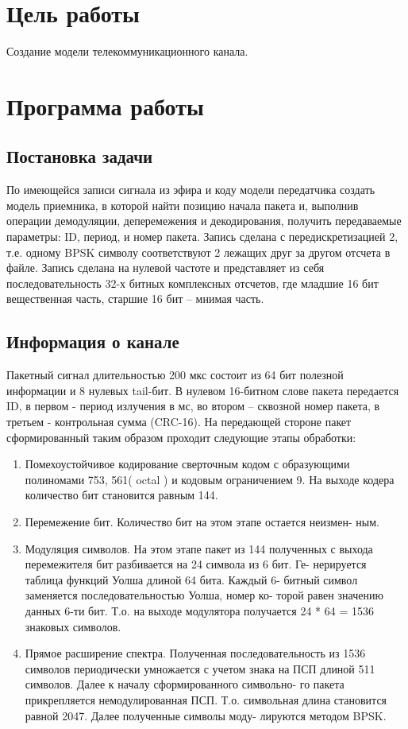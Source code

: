 
\usepackage{minted}




\setcounter{page}{2}



\section{Цель работы}
Создание модели телекоммуникационного канала.

\section{Программа работы}
\subsection{Постановка задачи}
По имеющейся записи сигнала из эфира и коду модели передатчика создать модель приемника, в которой найти позицию начала пакета и, выполнив операции демодуляции, деперемежения и декодирования, получить передаваемые параметры: ID, период, и номер пакета.
Запись сделана с передискретизацией 2, т.е. одному BPSK символу соответствуют 2 лежащих друг за другом отсчета в файле. Запись сделана на нулевой частоте и представляет из себя последовательность 32-х битных комплексных отсчетов, где младшие 16 бит вещественная часть, старшие 16 бит – мнимая часть.

\subsection{Информация о канале}
Пакетный сигнал длительностью 200 мкс состоит из 64 бит полезной информации и 8 нулевых tail-бит. В нулевом 16-битном слове пакета передается ID, в первом - период излучения в мс, во втором – сквозной номер пакета, в третьем - контрольная сумма (CRC-16). На передающей стороне пакет сформированный таким образом проходит следующие этапы обработки:
\begin{enumerate}
	\item Помехоустойчивое кодирование сверточным кодом с образующими
	полиномами 753, 561( octal ) и кодовым ограничением 9. На выходе
	кодера количество бит становится равным 144.
	\item Перемежение бит. Количество бит на этом этапе остается неизмен-
	ным.
	\item Модуляция символов. На этом этапе пакет из 144 полученных с
	выхода перемежителя бит разбивается на 24 символа из 6 бит. Ге-
	нерируется таблица функций Уолша длиной 64 бита. Каждый 6-
	битный символ заменяется последовательностью Уолша, номер ко-
	торой равен значению данных 6-ти бит. Т.о. на выходе модулятора
	получается 24 * 64 = 1536 знаковых символов.
	\item Прямое расширение спектра. Полученная последовательность из
	1536 символов периодически умножается с учетом знака на ПСП
	длиной 511 символов. Далее к началу сформированного символьно-
	го пакета прикрепляется немодулированная ПСП. Т.о. символьная
	длина становится равной 2047. Далее полученные символы моду-
	лируются методом BPSK.
\end{enumerate}

